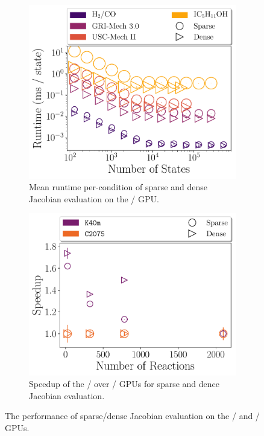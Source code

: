 \documentclass[12pt,number,sort&compress,preprint]{elsarticle}
\begin{document}
\begin{figure}[htbp]
   \centering
  \begin{subfigure}[t]{0.48\linewidth}
      \includegraphics[width=\textwidth]{gpu_sparse_vs_dense.pdf}
      \caption{Mean runtime per-condition of sparse and dense Jacobian evaluation on the \gpunew/ GPU.}
      \label{F:gpu_sparse_vs_dense}
  \end{subfigure}
  \hfill
  \begin{subfigure}[t]{0.48\linewidth}
      \includegraphics[width=\textwidth]{gpu_jacobian_speedup.pdf}
      \caption{Speedup of the \gpunew/ over \gpuold/ GPUs for sparse and dence Jacobian evaluation.}
      \label{F:gpu_jacobian_speedup}
  \end{subfigure}
  \caption{The performance of sparse\slash dense Jacobian evaluation on the \gpunew/ and \gpuold/ GPUs.}
\end{figure}
\end{document}
